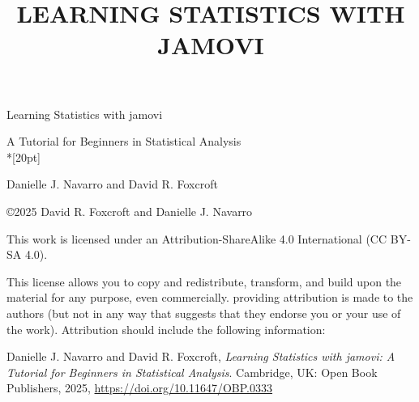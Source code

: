 \documentclass[
  a4paper,
]{book}
\title{LEARNING STATISTICS WITH JAMOVI}
\author{}
\date{}
\let\oldmaketitle\maketitle
\begin{document}
\frontmatter
\maketitle

\begin{center}

\end{center}
\pagestyle{empty}

\let\maketitle\oldmaketitle
\maketitle

\mainmatter
\pagestyle{plain}

\let\footnote=\endnote



\hspace{0pt}
\vfill
\begin{center}

\Huge{Learning Statistics with jamovi}

\Large{A Tutorial for Beginners in Statistical Analysis}\\*[20pt]

\normalsize{Danielle J. Navarro and David R. Foxcroft}

\vfill
\end{center}
\hspace{0pt}
\pagebreak

\hspace{0pt}
\vfill

\copyright 2025 David R. Foxcroft and Danielle J. Navarro

This work is licensed under an Attribution-ShareAlike 4.0 International (CC BY-SA 4.0).

This license allows you to copy and redistribute, transform, and build upon the material for any purpose, even commercially. providing attribution is made to the authors (but not in any way that suggests that they endorse you or your use of the work). Attribution should include the following information:

Danielle J. Navarro and David R. Foxcroft, \textit{Learning Statistics with jamovi: A Tutorial for Beginners in Statistical Analysis}. Cambridge, UK: Open Book Publishers, 2025, \url{https://doi.org/10.11647/OBP.0333}
\end{document}
